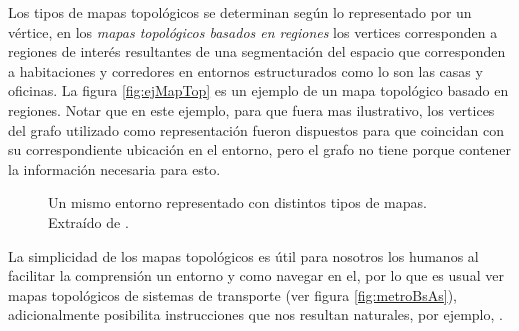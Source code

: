 Los tipos de mapas topológicos se determinan según lo representado por un vértice, en los \emph{mapas topológicos basados en regiones} los vertices corresponden a regiones de interés resultantes de una segmentación del espacio que corresponden a habitaciones y corredores en entornos estructurados como lo son las casas y oficinas. La figura \ref{fig:ejMapTop} es un ejemplo de un mapa topológico basado en regiones. Notar que en este ejemplo, para que fuera mas ilustrativo, los vertices del grafo utilizado como representación fueron dispuestos para que coincidan con su correspondiente ubicación en el entorno, pero el grafo no tiene porque contener la información necesaria para esto.

\begin{figure}[H]
  \centering
  \qquad
  \qquad
  \caption{Un mismo entorno representado con distintos tipos de mapas. Extraído de \cite{choset2005principles}.}
\end{figure}

La simplicidad de los mapas topológicos es útil para nosotros los humanos al facilitar la comprensión un entorno y como navegar en el, por lo que es usual ver mapas topológicos de sistemas de transporte (ver figura \ref{fig:metroBsAs}), adicionalmente posibilita instrucciones que nos resultan naturales, por ejemplo, .

